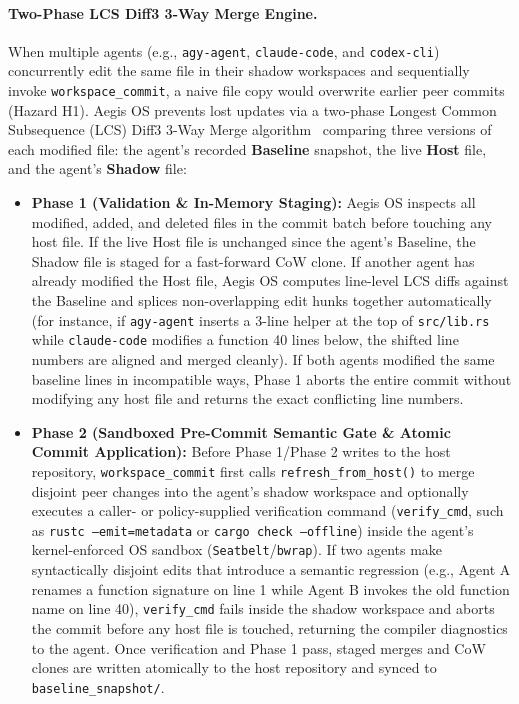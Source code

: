 \documentclass[10pt,twocolumn]{article}
\begin{document}
\paragraph{Two-Phase LCS Diff3 3-Way Merge Engine.} When multiple agents (e.g., \texttt{agy-agent}, \texttt{claude-code}, and \texttt{codex-cli}) concurrently edit the same file in their shadow workspaces and sequentially invoke \texttt{workspace\_commit}, a naive file copy would overwrite earlier peer commits (Hazard H1). Aegis OS prevents lost updates via a two-phase Longest Common Subsequence (LCS) Diff3 3-Way Merge algorithm~\cite{khanna2007formal} comparing three versions of each modified file: the agent's recorded \textbf{Baseline} snapshot, the live \textbf{Host} file, and the agent's \textbf{Shadow} file:
\begin{itemize}
    \item \textbf{Phase 1 (Validation \& In-Memory Staging):} Aegis OS inspects all modified, added, and deleted files in the commit batch before touching any host file. If the live Host file is unchanged since the agent's Baseline, the Shadow file is staged for a fast-forward CoW clone. If another agent has already modified the Host file, Aegis OS computes line-level LCS diffs against the Baseline and splices non-overlapping edit hunks together automatically (for instance, if \texttt{agy-agent} inserts a 3-line helper at the top of \texttt{src/lib.rs} while \texttt{claude-code} modifies a function 40 lines below, the shifted line numbers are aligned and merged cleanly). If both agents modified the same baseline lines in incompatible ways, Phase 1 aborts the entire commit without modifying any host file and returns the exact conflicting line numbers.
    \item \textbf{Phase 2 (Sandboxed Pre-Commit Semantic Gate \& Atomic Commit Application):} Before Phase 1/Phase 2 writes to the host repository, \texttt{workspace\_commit} first calls \texttt{refresh\_from\_host()} to merge disjoint peer changes into the agent's shadow workspace and optionally executes a caller- or policy-supplied verification command (\texttt{verify\_cmd}, such as \texttt{rustc --emit=metadata} or \texttt{cargo check --offline}) inside the agent's kernel-enforced OS sandbox (\texttt{Seatbelt}/\texttt{bwrap}). If two agents make syntactically disjoint edits that introduce a semantic regression (e.g., Agent A renames a function signature on line 1 while Agent B invokes the old function name on line 40), \texttt{verify\_cmd} fails inside the shadow workspace and aborts the commit before any host file is touched, returning the compiler diagnostics to the agent. Once verification and Phase 1 pass, staged merges and CoW clones are written atomically to the host repository and synced to \texttt{baseline\_snapshot/}.
\end{itemize}
\end{document}
